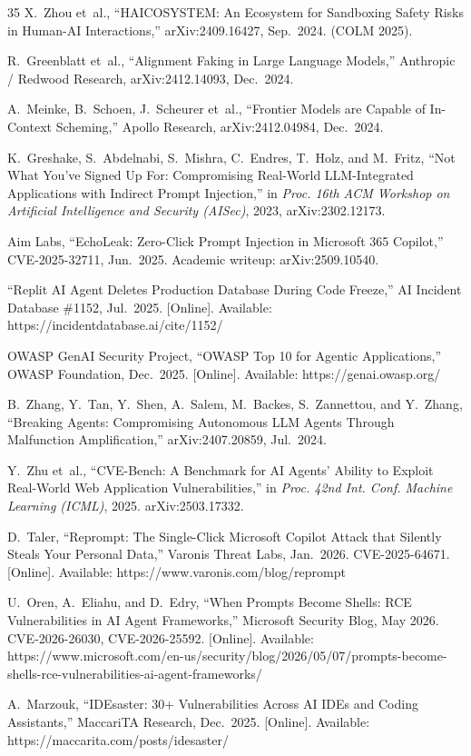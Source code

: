 \documentclass{IEEEoj-data}
\newcommand{\added}[1]{#1}
\begin{document}
\begin{thebibliography}{35}
\added{X.~Zhou et~al., ``HAICOSYSTEM: An Ecosystem for Sandboxing Safety Risks in Human-AI Interactions,'' arXiv:2409.16427, Sep.\ 2024. (COLM 2025).}

\added{R.~Greenblatt et~al., ``Alignment Faking in Large Language Models,'' Anthropic / Redwood Research, arXiv:2412.14093, Dec.\ 2024.}

\added{A.~Meinke, B.~Schoen, J.~Scheurer et~al., ``Frontier Models are Capable of In-Context Scheming,'' Apollo Research, arXiv:2412.04984, Dec.\ 2024.}

\added{K.~Greshake, S.~Abdelnabi, S.~Mishra, C.~Endres, T.~Holz, and M.~Fritz, ``Not What You've Signed Up For: Compromising Real-World LLM-Integrated Applications with Indirect Prompt Injection,'' in {\it Proc. 16th ACM Workshop on Artificial Intelligence and Security (AISec)}, 2023, arXiv:2302.12173.}

\added{Aim Labs, ``EchoLeak: Zero-Click Prompt Injection in Microsoft 365 Copilot,'' CVE-2025-32711, Jun.\ 2025. Academic writeup: arXiv:2509.10540.}

\added{``Replit AI Agent Deletes Production Database During Code Freeze,'' AI Incident Database \#1152, Jul.\ 2025. [Online]. Available: https://incidentdatabase.ai/cite/1152/}

\added{OWASP GenAI Security Project, ``OWASP Top 10 for Agentic Applications,'' OWASP Foundation, Dec.\ 2025. [Online]. Available: https://genai.owasp.org/}

\added{B.~Zhang, Y.~Tan, Y.~Shen, A.~Salem, M.~Backes, S.~Zannettou, and Y.~Zhang, ``Breaking Agents: Compromising Autonomous LLM Agents Through Malfunction Amplification,'' arXiv:2407.20859, Jul.\ 2024.}

\added{Y.~Zhu et~al., ``CVE-Bench: A Benchmark for AI Agents' Ability to Exploit Real-World Web Application Vulnerabilities,'' in {\it Proc. 42nd Int. Conf. Machine Learning (ICML)}, 2025. arXiv:2503.17332.}

\added{D.~Taler, ``Reprompt: The Single-Click Microsoft Copilot Attack that Silently Steals Your Personal Data,'' Varonis Threat Labs, Jan.\ 2026. CVE-2025-64671. [Online]. Available: https://www.varonis.com/blog/reprompt}

\added{U.~Oren, A.~Eliahu, and D.~Edry, ``When Prompts Become Shells: RCE Vulnerabilities in AI Agent Frameworks,'' Microsoft Security Blog, May 2026. CVE-2026-26030, CVE-2026-25592. [Online]. Available: https://www.microsoft.com/en-us/security/blog/2026/05/07/prompts-become-shells-rce-vulnerabilities-ai-agent-frameworks/}

\added{A.~Marzouk, ``IDEsaster: 30+ Vulnerabilities Across AI IDEs and Coding Assistants,'' MaccariTA Research, Dec.\ 2025. [Online]. Available: https://maccarita.com/posts/idesaster/}

\end{thebibliography}
\end{document}
